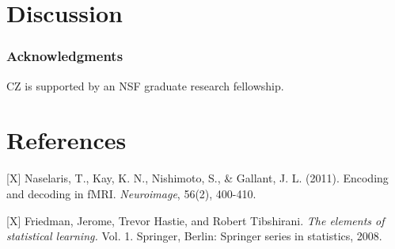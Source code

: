 \documentclass{article}
\begin{document}
\section{Discussion}


\subsubsection*{Acknowledgments}

CZ is supported by an NSF graduate research fellowship.

\section*{References}

\small

[X] Naselaris, T., Kay, K. N., Nishimoto, S., \& Gallant,
J. L. (2011). Encoding and decoding in fMRI. \emph{Neuroimage}, 56(2),
400-410.

[X] Friedman, Jerome, Trevor Hastie, and Robert Tibshirani. \emph{The elements
of statistical learning.} Vol. 1. Springer, Berlin: Springer series in
statistics, 2008.
\end{document}
